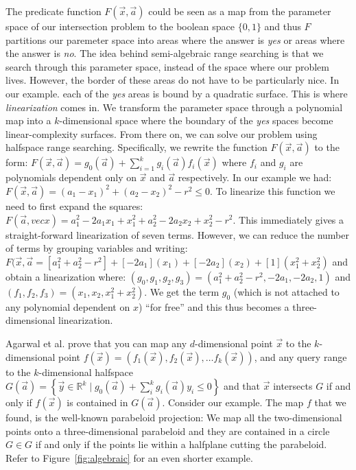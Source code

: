 \documentclass[UKenglish]{lipics-v2019}
\newcommand{\etal}{\textnormal{et al.}\xspace}
\begin{document}
The predicate function $F(\vec{x}, \vec{a})$ could be seen as a map from the parameter space of our intersection problem to the boolean space $\{0,1\}$ and thus $F$ partitions our paremeter space into areas where the answer is \emph{yes} or areas where the answer is \emph{no}. The idea behind semi-algebraic range searching is that we search through this parameter space, instead of the space where our problem lives. However, the border of these areas do not have to be particularly nice. In our example. each of the \emph{yes} areas is bound by a quadratic surface. This is where \emph{linearization} comes in. We transform the parameter space through a polynomial map into a $k$-dimensional space where the boundary of the \emph{yes} spaces become linear-complexity surfaces. From there on, we can solve our problem using halfspace range searching. Specifically, we rewrite the function $F(\vec{x}, \vec{a})$ to the form: $F(\vec{x}, \vec{a}) =  g_0(\vec{a}) + \sum_{i=1}^k g_i(\vec{a})f_i(\vec{x})$ where $f_i$ and $g_i$ are polynomials dependent only on $\vec{x}$ and $\vec{a}$ respectively. In our example we had: $F(\vec{x}, \vec{a}) = (a_1 - x_1)^2 + (a_2 - x_2)^2 - r^2 \le 0$. To linearize this function we need to first expand the squares: $F(\vec{a}, vec{x}) = a_1^2 - 2 a_1 x_1 + x_1^2 + a_2^2 - 2 a_2 x_2 + x_2^2 - r^2$. This immediately gives a straight-forward linearization of seven terms. However, we can reduce the number of terms by grouping variables and writing: $F(\vec{x}, \vec{a} = [a_1^2 + a_2^2 - r^2] + [-2 a_1](x_1) + [-2 a_2](x_2) + [1](x_1^2 + x_2^2)$ and obtain a linearization where: $(g_0, g_1, g_2, g_3) = (a_1^2 + a_2^2 - r^2, -2a_1, -2a_2, 1)$ and $(f_1, f_2, f_3) = (x_1, x_2, x_1^2 + x_2^2)$. We get the term $g_0$ (which is not attached to any polynomial dependent on $x$) ``for free'' and this thus becomes a three-dimensional linearization.

Agarwal \etal prove that you can map any $d$-dimensional point $\vec{x}$ to the $k$-dimensional point $f(\vec{x}) = (f_1(\vec{x}), f_2(\vec{x}), \dots f_k(\vec{x}))$, and any query range to the $k$-dimensional halfspace $G(\vec{a}) = \left\{ \vec{y} \in \mathbb{R}^k \mid g_0(\vec{a})  + \sum_i^k g_i(\vec{a})y_i  \le 0 \right\}$ and that $\vec{x}$ intersects $G$ if and only if $f(\vec{x})$ is contained in $G(\vec{a})$. 
Consider our example. The map $f$ that we found, is the well-known parabeloid projection: We map all the two-dimensional points onto a three-dimensional parabeloid and they are contained in a circle $G \in G$ if and only if the points lie within a halfplane cutting the parabeloid.  Refer to Figure~\ref{fig:algebraic} for an even shorter example.
\end{document}
